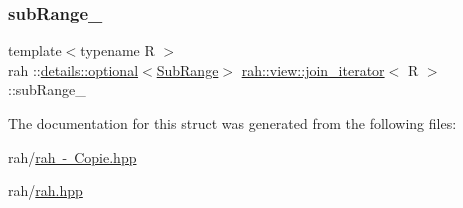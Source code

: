 \subsubsection{\texorpdfstring{subRange\_}{subRange\_}\hspace{0.1cm}{\footnotesize\ttfamily [2/2]}}
{\footnotesize\ttfamily template$<$typename R $>$ \\
rah \+::\mbox{\hyperlink{structrah_1_1view_1_1details_1_1optional}{details\+::optional}}$<$\mbox{\hyperlink{structrah_1_1view_1_1join__iterator_1_1_sub_range}{Sub\+Range}}$>$ \mbox{\hyperlink{structrah_1_1view_1_1join__iterator}{rah\+::view\+::join\+\_\+iterator}}$<$ R $>$\+::sub\+Range\+\_\+}



The documentation for this struct was generated from the following files\+:\begin{DoxyCompactItemize}
\item 
rah/\mbox{\hyperlink{rah_01-_01_copie_8hpp}{rah -\/ Copie.\+hpp}}\item 
rah/\mbox{\hyperlink{rah_8hpp}{rah.\+hpp}}\end{DoxyCompactItemize}

